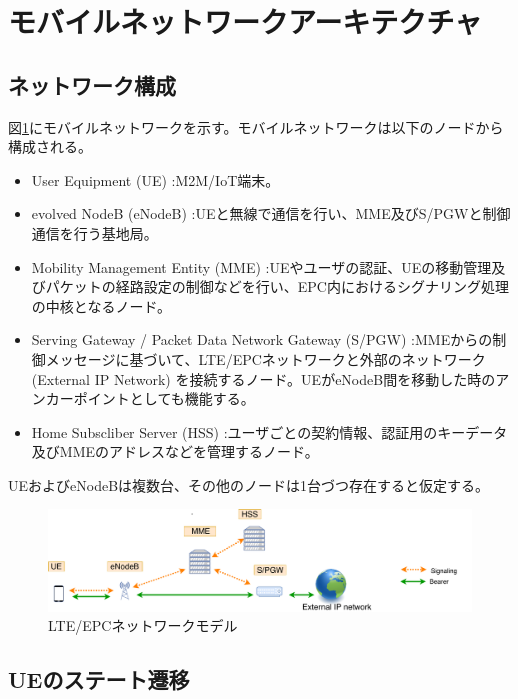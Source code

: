 \documentclass[a4j]{ujarticle}
\begin{document}
\clearpage
\section{モバイルネットワークアーキテクチャ}
  \subsection{ネットワーク構成}
    図\ref{networkmodel}にモバイルネットワークを示す。モバイルネットワークは以下のノードから構成される。
    \begin{itemize}
      \item User Equipment (UE) :M2M/IoT端末。
      \item evolved NodeB (eNodeB) :UEと無線で通信を行い、MME及びS/PGWと制御通信を行う基地局。
      \item Mobility Management Entity (MME) :UEやユーザの認証、UEの移動管理及びパケットの経路設定の制御などを行い、EPC内におけるシグナリング処理の中核となるノード。
      \item Serving Gateway / Packet Data Network Gateway (S/PGW) :MMEからの制御メッセージに基づいて、LTE/EPCネットワークと外部のネットワーク(External IP Network) を接続するノード。UEがeNodeB間を移動した時のアンカーポイントとしても機能する。
      \item Home Subscliber Server (HSS) :ユーザごとの契約情報、認証用のキーデータ及びMMEのアドレスなどを管理するノード。
    \end{itemize}
    UEおよびeNodeBは複数台、その他のノードは1台づつ存在すると仮定する。
    \begin{figure}[htbp]
      \centering
      \includegraphics[width=0.7\hsize]{networkmodel.pdf}
      \caption{LTE/EPCネットワークモデル}
      \label{networkmodel}
    \end{figure}


  \subsection{UEのステート遷移}
\end{document}

